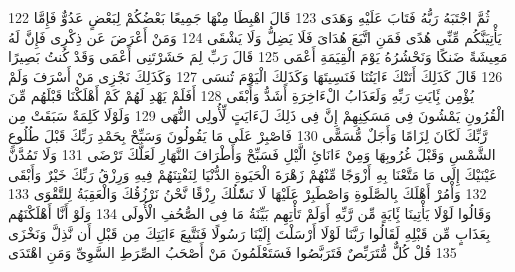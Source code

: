 \documentclass[20pt,a4paper]{article}
\begin{document}
{\tiny\colorbox{cl_aya}{122}} ثُمَّ اجْتَبَهُ رَبُّهُ فَتَابَ عَلَيْهِ وَهَدَى
{\tiny\colorbox{cl_aya}{123}} قَالَ اهْبِطَا مِنْهَا جَمِيعًا بَعْضُكُمْ لِبَعْضٍ عَدُوٌّ فَإِمَّا يَأْتِيَنَّكُم مِّنِّى هُدًى فَمَنِ اتَّبَعَ هُدَاىَ فَلَا يَضِلُّ وَلَا يَشْقَى
{\tiny\colorbox{cl_aya}{124}} وَمَنْ أَعْرَضَ عَن ذِكْرِى فَإِنَّ لَهُ مَعِيشَةً ضَنكًا وَنَحْشُرُهُ يَوْمَ الْقِيَمَةِ أَعْمَى
{\tiny\colorbox{cl_aya}{125}} قَالَ رَبِّ لِمَ حَشَرْتَنِى أَعْمَى وَقَدْ كُنتُ بَصِيرًا
{\tiny\colorbox{cl_aya}{126}} قَالَ كَذَلِكَ أَتَتْكَ ءَايَتُنَا فَنَسِيتَهَا وَكَذَلِكَ الْيَوْمَ تُنسَى
{\tiny\colorbox{cl_aya}{127}} وَكَذَلِكَ نَجْزِى مَنْ أَسْرَفَ وَلَمْ يُؤْمِن بَِٔايَتِ رَبِّهِ وَلَعَذَابُ الْءَاخِرَةِ أَشَدُّ وَأَبْقَى
{\tiny\colorbox{cl_aya}{128}} أَفَلَمْ يَهْدِ لَهُمْ كَمْ أَهْلَكْنَا قَبْلَهُم مِّنَ الْقُرُونِ يَمْشُونَ فِى مَسَكِنِهِمْ إِنَّ فِى ذَلِكَ لَءَايَتٍ لِّأُولِى النُّهَى
{\tiny\colorbox{cl_aya}{129}} وَلَوْلَا كَلِمَةٌ سَبَقَتْ مِن رَّبِّكَ لَكَانَ لِزَامًا وَأَجَلٌ مُّسَمًّى
{\tiny\colorbox{cl_aya}{130}} فَاصْبِرْ عَلَى مَا يَقُولُونَ وَسَبِّحْ بِحَمْدِ رَبِّكَ قَبْلَ طُلُوعِ الشَّمْسِ وَقَبْلَ غُرُوبِهَا وَمِنْ ءَانَائِ الَّيْلِ فَسَبِّحْ وَأَطْرَافَ النَّهَارِ لَعَلَّكَ تَرْضَى
{\tiny\colorbox{cl_aya}{131}} وَلَا تَمُدَّنَّ عَيْنَيْكَ إِلَى مَا مَتَّعْنَا بِهِ أَزْوَجًا مِّنْهُمْ زَهْرَةَ الْحَيَوةِ الدُّنْيَا لِنَفْتِنَهُمْ فِيهِ وَرِزْقُ رَبِّكَ خَيْرٌ وَأَبْقَى
{\tiny\colorbox{cl_aya}{132}} وَأْمُرْ أَهْلَكَ بِالصَّلَوةِ وَاصْطَبِرْ عَلَيْهَا لَا نَسَْٔلُكَ رِزْقًا نَّحْنُ نَرْزُقُكَ وَالْعَقِبَةُ لِلتَّقْوَى
{\tiny\colorbox{cl_aya}{133}} وَقَالُوا لَوْلَا يَأْتِينَا بَِٔايَةٍ مِّن رَّبِّهِ أَوَلَمْ تَأْتِهِم بَيِّنَةُ مَا فِى الصُّحُفِ الْأُولَى
{\tiny\colorbox{cl_aya}{134}} وَلَوْ أَنَّا أَهْلَكْنَهُم بِعَذَابٍ مِّن قَبْلِهِ لَقَالُوا رَبَّنَا لَوْلَا أَرْسَلْتَ إِلَيْنَا رَسُولًا فَنَتَّبِعَ ءَايَتِكَ مِن قَبْلِ أَن نَّذِلَّ وَنَخْزَى
{\tiny\colorbox{cl_aya}{135}} قُلْ كُلٌّ مُّتَرَبِّصٌ فَتَرَبَّصُوا فَسَتَعْلَمُونَ مَنْ أَصْحَبُ الصِّرَطِ السَّوِىِّ وَمَنِ اهْتَدَى
\end{document}
